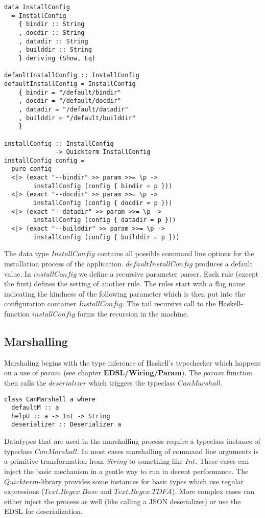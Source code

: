\documentclass[a4paper]{article}
\begin{document}
\begin{lstlisting}
data InstallConfig
  = InstallConfig
    { bindir :: String
    , docdir :: String
    , datadir :: String
    , builddir :: String
    } deriving (Show, Eq)

defaultInstallConfig :: InstallConfig
defaultInstallConfig = InstallConfig
    { bindir = "/default/bindir"
    , docdir = "/default/docdir"
    , datadir = "/default/datadir"
    , builddir = "/default/builddir"
    }

installConfig :: InstallConfig
              -> Quickterm InstallConfig
installConfig config =
  pure config
  <|> (exact "--bindir" >> param >>= \p ->
        installConfig (config { bindir = p }))
  <|> (exact "--docdir" >> param >>= \p ->
        installConfig (config { docdir = p }))
  <|> (exact "--datadir" >> param >>= \p ->
        installConfig (config { datadir = p }))
  <|> (exact "--builddir" >> param >>= \p ->
        installConfig (config { builddir = p }))
\end{lstlisting}

The data type $InstallConfig$ contains all possible command line options for the installation process of the application. $defaultInstallConfig$ produces a default value. In $installConfig$ we define a recursive parameter parser. Each rule (except the first) defines the setting of another rule. The rules start with a flag name indicating the kindness of the following parameter which is then put into the configuration container $InstallConfig$. The tail recursive call to the Haskell-function $installConfig$ forms the recursion in the machine.

\subsection{Marshalling}
Marshaling begins with the type inference of Haskell's typechecker which happens on a use of $param$ (see chapter \textbf{EDSL/Wiring/Param}). The $param$ function then calls the $deserializer$ which triggers the typeclass $CanMarshall$.

\begin{lstlisting}
class CanMarshall a where
  defaultM :: a
  helpU :: a -> Int -> String
  deserializer :: Deserializer a
\end{lstlisting}

Datatypes that are used in the marshalling process require a typeclass instance of typeclass $CanMarshall$. In most cases marshalling of command line arguments is a primitive transformation from $String$ to something like $Int$. These cases can inject the basic mechanism in a gentle way to run in decent performance. The $Quickterm$-library provides some instances for basic types which use regular expressions ($Text.Regex.Base$ and $Text.Regex.TDFA$). More complex cases can either inject the process as well (like calling a JSON deserializer) or use the EDSL for deserialization.
\end{document}

